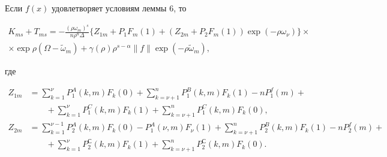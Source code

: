 \begin{lem}


Если $f(x)$ удовлетворяет условиям леммы $6$, то


\begin{multline}


K_{ms}+T_{ms}=- \frac {(\rho\omega_m)^s}{n\rho^n


\Delta}\{Z_{1m}+P_1F_m(1)+(Z_{2m}+P_2F_m(1))\exp(-\rho


\omega_\nu)\}\times \\


%


\times\exp\rho(\Omega-\widetilde\omega_m)+\gamma(\rho)\rho^{s-\alpha}


\|f\|\exp(-\rho\widetilde\omega_m),


\end{multline}


где


\begin{align*}


Z_{1m}&=\sum\limits_{k=1}^{\nu}P_1^A(k,m)F_k(0)


+\sum\limits_{k=\nu+1}^nP_1^B(k,m)F_k(1)-nP_1^f(m)+ \\


%


&\qquad +\sum\limits_{k=1}^{\nu}P_1^C(k,m)F_k(1)+


\sum\limits_{k=\nu+1}^nP_1^C(k,m)F_k(0), \\


%


Z_{2m}&=\sum\limits_{k=1}^{\nu-1}P_2^A(k,m)F_k(0)-


P_1^A(\nu,m)F_\nu(1)+


\sum\limits_{k=\nu+1}^nP_2^B(k,m)F_k(1)


-nP_2^f(m)+ \\


%


&\qquad+\sum\limits_{k=1}^{\nu}P_2^С(k,m)F_k(1)+


\sum\limits_{k=\nu+1}^nP_2^С(k,m)F_k(0).


\end{align*}


\end{lem}





